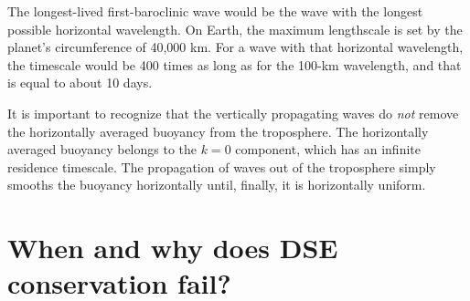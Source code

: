 \documentclass[12pt]{article}
\begin{document}
The longest-lived first-baroclinic wave would be the wave with the longest possible horizontal wavelength.  On Earth, the maximum lengthscale is set by the planet's circumference of 40,000 km.  For a wave with that horizontal wavelength, the timescale would be 400 times as long as for the 100-km wavelength, and that is equal to about 10 days.


It is important to recognize that the vertically propagating waves do {\it not} remove the horizontally averaged buoyancy from the troposphere.  The horizontally averaged buoyancy belongs to the $k=0$ component, which has an infinite residence timescale.  The propagation of waves out of the troposphere simply smooths the buoyancy horizontally until, finally, it is horizontally uniform.


\section{When and why does DSE conservation fail?}
\end{document}
